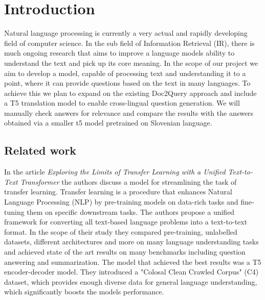 \documentclass[fleqn,moreauthors,10pt]{ds_report}
\affiliation{\textit{Advisors: Slavko Žitnik}}
\begin{document}
\flushbottom 

\maketitle 

\thispagestyle{empty} 


\section*{Introduction}
Natural language processing is currently a very actual and rapidly developing field of computer science. In the sub field of Information Retrieval (IR), there is much ongoing research that aims to improve a language models ability to understand the text and pick up its core meaning. In the scope of our project we aim to develop a model, capable of processing text and understanding it to a point, where it can provide questions based on the text in many languages. To achieve this we plan to expand on the existing Doc2Query approach and include a T5 translation model to enable cross-lingual question generation. We will manually check answers for relevance and compare the results with the answers obtained via a smaller t5 model pretrained on Slovenian language.

\subsection*{Related work}

In the article \textit{Exploring the Limits of Transfer Learning with a Unified Text-to-Text Transformer}\cite{DBLP:journals/corr/abs-1910-10683} the authors discuss a model for streamlining the task of transfer learning. Transfer learning is a procedure that enhances Natural Language Processing (NLP) by pre-training models on data-rich tasks and fine-tuning them on specific downstream tasks. The authors propose a unified framework for converting all text-based language problems into a text-to-text format. In the scope of their study they compared pre-training, unlabelled datasets, different architectures and more on many language understanding tasks and achieved state of the art results on many benchmarks including question answering and summarization. The model that achieved the best results was a T5 encoder-decoder model. They introduced a "Colosal Clean Crawled Corpus" (C4) dataset, which provides enough diverse data for general language understanding, which significantly boosts the models performance.
\end{document}
